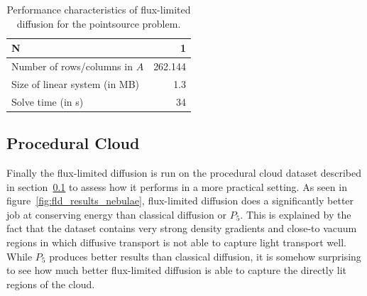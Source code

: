 \begin{table}[!h]
	\centering
	\caption{Performance characteristics of flux-limited diffusion for the pointsource problem.}
	\label{tab:results_pointsource}
	\begin{tabular}{l r}
    \hline
	\textbf{N}
    & 1
    \\
    \hline
    Number of rows/columns in $A$
    & 262.144
    \\
    Size of linear system (in MB)
    & 1.3
    \\
    Solve time (in s)
    & 34
	\end{tabular}
\end{table}

%

\subsection{Procedural Cloud}
\label{sec:pn_results_clouds}

Finally the flux-limited diffusion is run on the procedural cloud dataset described in section~\ref{sec:pn_results_clouds} to assess how it performs in a more practical setting. As seen in figure~\ref{fig:fld_results_nebulae}, flux-limited diffusion does a significantly better job at conserving energy than classical diffusion or $P_5$. This is explained by the fact that the dataset contains very strong density gradients and close-to vacuum regions in which diffusive transport is not able to capture light transport well. While $P_5$ produces better results than classical diffusion, it is somehow surprising to see how much better flux-limited diffusion is able to capture the directly lit regions of the cloud.

